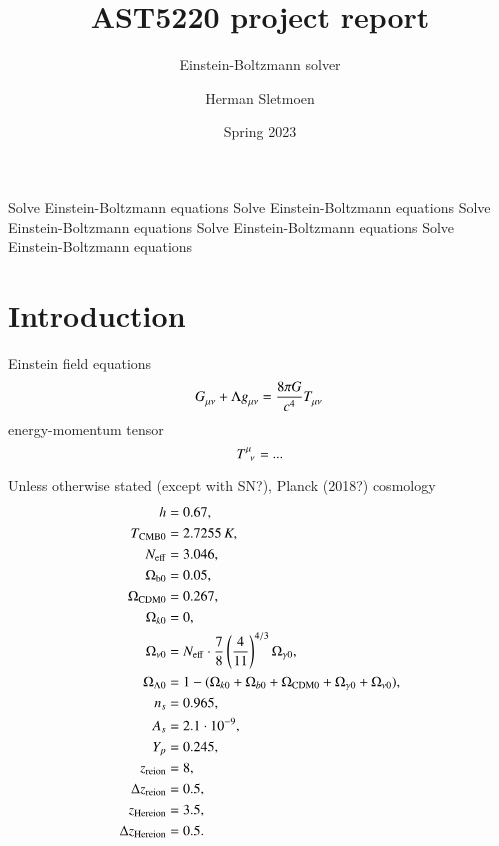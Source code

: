 \documentclass{aa}
\begin{document}
\title{AST5220 project report}
\subtitle{Einstein-Boltzmann solver}
\author{Herman Sletmoen}

\date{Spring 2023}

\abstract
{Solve Einstein-Boltzmann equations}
{Solve Einstein-Boltzmann equations}
{Solve Einstein-Boltzmann equations}
{Solve Einstein-Boltzmann equations}
{Solve Einstein-Boltzmann equations}


\maketitle
%

\section{Introduction}

Einstein field equations
\begin{equation}
	G\indices{_\mu_\nu} + \Lambda g\indices{_\mu_\nu} = \frac{8 \pi G}{c^4} T\indices{_\mu_\nu}
\label{eq_einstein}
\end{equation}
energy-momentum tensor
\begin{equation}
	T\indices{^\mu_\nu} = ...
\label{eq_energy_momentum}
\end{equation}

Unless otherwise stated (except with SN?),
Planck (2018?) cosmology
\begin{align}
h &= 0.67, \\
T_{\rm CMB 0} &= 2.7255\,K, \\
N_{\rm eff} &= 3.046, \\
\Omega_{\rm b 0} &= 0.05, \\
\Omega_{\rm CDM 0} &= 0.267,\\
\Omega_{k 0} &= 0, \\
\Omega_{\nu 0} &= N_{\rm eff}\cdot \frac{7}{8}\left(\frac{4}{11}\right)^{4/3}\Omega_{\gamma 0}, \\
\Omega_{\Lambda 0} &= 1 - (\Omega_{k 0}+\Omega_{b 0}+\Omega_{\rm CDM 0}+\Omega_{\gamma 0}+\Omega_{\nu 0}),\\
n_s &= 0.965, \\
A_s &= 2.1\cdot 10^{-9}, \\
Y_p &= 0.245, \\
z_{\rm reion} &= 8, \\
\Delta z_{\rm reion} &= 0.5, \\
z_{\rm He reion} &= 3.5, \\
\Delta z_{\rm He reion} &= 0.5.
\end{align}
\end{document}

